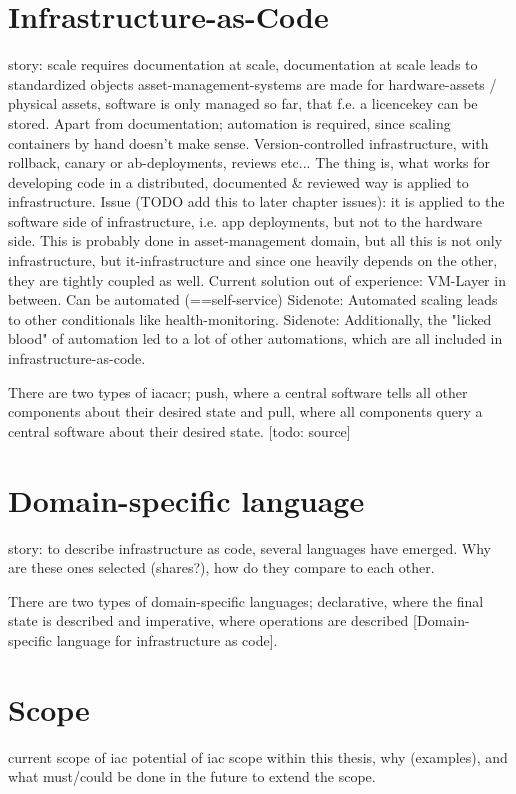 \section{Infrastructure-as-Code}
story:
scale requires documentation at scale, documentation at scale leads to standardized objects
asset-management-systems are made for hardware-assets / physical assets, software is only managed so far, that f.e. a licencekey can be stored.
Apart from documentation; automation is required, since scaling containers by hand doesn't make sense.
Version-controlled infrastructure, with rollback, canary or ab-deployments, reviews etc...
The thing is, what works for developing code in a distributed, documented & reviewed way is applied to infrastructure.
Issue (TODO add this to later chapter issues): it is applied to the software side of infrastructure, i.e. app deployments, but not to the hardware side. This is probably done in asset-management domain, but all this is not only infrastructure, but it-infrastructure and since one heavily depends on the other, they are tightly coupled as well. Current solution out of experience: VM-Layer in between. Can be automated (==self-service)
Sidenote: Automated scaling leads to other conditionals like health-monitoring.
Sidenote: Additionally, the "licked blood" of automation led to a lot of other automations, which are all included in infrastructure-as-code.


  There are two types of \gls{iacacr}; push, where a central software tells all other components about their desired state and pull, where all components query a central software about their desired state. [todo: source]

\section{Domain-specific language}
story:
to describe infrastructure as code, several languages have emerged.
Why are these ones selected (shares?), how do they compare to each other.

  There are two types of domain-specific languages; declarative, where the final state is described and imperative, where operations are described [Domain-specific language for infrastructure as code].

\section{Scope} %
current scope of iac
potential of iac
scope within this thesis, why (examples), and what must/could be done in the future to extend the scope.

